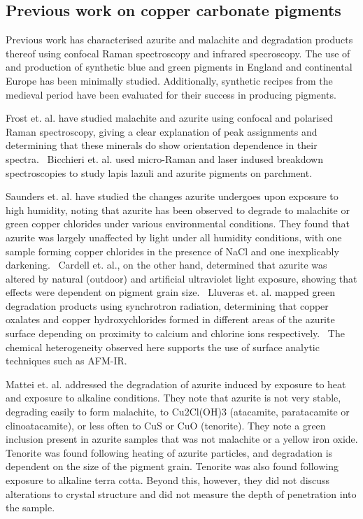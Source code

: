 \subsection[Previous work on copper carbonate pigments]{Previous work on copper carbonate pigments}
\label{subsection1.2.2}

Previous work has characterised azurite and malachite and degradation products thereof using confocal Raman spectroscopy and infrared specroscopy. The use of and production of synthetic blue and green pigments in England and continental Europe has been minimally studied. Additionally, synthetic recipes from the medieval period have been evaluated for their success in producing pigments.

Frost et. al. have studied malachite and azurite using confocal and polarised Raman spectroscopy, giving a clear explanation of peak assignments and determining that these minerals do show orientation dependence in their spectra.~\autocite{Frost} Bicchieri et. al. used micro-Raman and laser indused breakdown spectroscopies to study lapis lazuli and azurite pigments on parchment.~\autocite{Bicchieri} 

Saunders et. al. have studied the changes azurite undergoes upon exposure to high humidity, noting that azurite has been observed to degrade to malachite or green copper chlorides under various environmental conditions. They found that azurite was largely unaffected by light under all humidity conditions, with one sample forming copper chlorides in the presence of NaCl and one inexplicably darkening.~\autocite{Saunders} Cardell et. al., on the other hand, determined that azurite was altered by natural (outdoor) and artificial ultraviolet light exposure, showing that effects were dependent on pigment grain size.~\autocite{Cardell} Lluveras et. al. mapped green degradation products using synchrotron radiation, determining that copper oxalates and copper hydroxychlorides formed in different areas of the azurite surface depending on proximity to calcium and chlorine ions respectively.~\autocite{Lluveras} The chemical heterogeneity observed here supports the use of surface analytic techniques such as AFM-IR. 

Mattei et. al. addressed the degradation of azurite induced by exposure to heat and exposure to alkaline conditions. They note that azurite is not very stable, degrading easily to form malachite, to Cu2Cl(OH)3 (atacamite, paratacamite or clinoatacamite), or less often to CuS or CuO (tenorite). They note a green inclusion present in azurite samples that was not malachite or a yellow iron oxide. Tenorite was found following heating of azurite particles, and degradation is dependent on the size of the pigment grain. Tenorite was also found following exposure to alkaline terra cotta. Beyond this, however, they did not discuss alterations to crystal structure and did not measure the depth of penetration into the sample.~\autocite{Mattei} 

